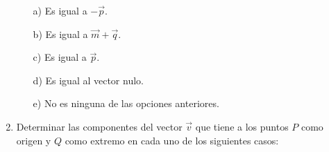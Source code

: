 \documentclass[11pt]{article}
\begin{document}
\begin{enumerate}[\hspace{-3mm}$1)$]
\begin{minipage}{.6\textwidth}
\begin{center}

    
\end{center}
 \end{minipage}\quad\begin{minipage}{.38\textwidth}


    \begin{itemize}
        \item[a)] Es igual a $-\vec{p}$.
        \item[b)] Es igual a $\vec{m} + \vec{q}$.
        \item[c)] Es igual a $\vec{p}$.
        \item[d)] Es igual al vector nulo.
        \item[e)] No es ninguna de las opciones anteriores.
    \end{itemize}
\end{minipage}























\item  Determinar las componentes del vector $\vec{v}$ que tiene a los puntos $P$ como origen y $Q$ como extremo en cada uno de los siguientes casos:

    \begin{enumerate}[a) ] 
    \end{enumerate}























\end{enumerate}
\end{document}
